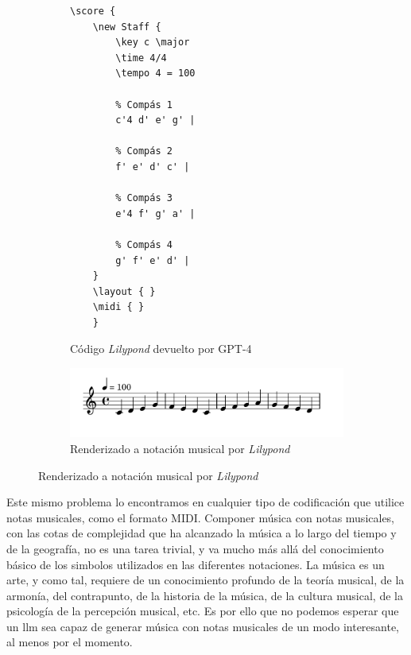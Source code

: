 \begin{figure}[h]
    \caption[Melodía de 4 compases generada por GPT-4, al estilo de Bach]{Melodía de 4 compases generada por GPT-4, al estilo de Bach. El \gls{llm} la entregó en formato Lilypond.}
    \centering
    \begin{subfigure}{.48\textwidth}
        \centering
        \begin{mdframed}
        \begin{verbatim}
\score {
    \new Staff {
        \key c \major
        \time 4/4
        \tempo 4 = 100
    
        % Compás 1
        c'4 d' e' g' |
    
        % Compás 2
        f' e' d' c' |
    
        % Compás 3
        e'4 f' g' a' |
    
        % Compás 4
        g' f' e' d' |
    }
    \layout { }
    \midi { }
    }
        \end{verbatim}
        \end{mdframed}
        \caption{Código \textit{Lilypond} devuelto por GPT-4}
      \end{subfigure} \hfill

      \vspace{5mm} %

      \begin{subfigure}{.75\textwidth}
        \centering
        \includegraphics[width=1\textwidth]{./figuras/melodia_bach_estilo.png}
        \caption{Renderizado a notación musical por \textit{Lilypond}}
      \end{subfigure}\hfill
    \source{\propio}
    \label{fig:melodia_bach}
\end{figure}

Este mismo problema lo encontramos en cualquier tipo de codificación que utilice notas musicales, como el formato MIDI.
Componer música con notas musicales, con las cotas de complejidad que ha alcanzado la música a lo largo del tiempo y de la geografía, no es una tarea trivial, y va mucho más allá del conocimiento básico de los simbolos utilizados en las diferentes notaciones. La música es un arte, y como tal, requiere de un conocimiento profundo de la teoría musical, de la armonía, del contrapunto, de la historia de la música, de la cultura musical, de la psicología de la percepción musical, etc. Es por ello que no podemos esperar que un \gls{llm} sea capaz de generar música con notas musicales de un modo interesante, al menos por el momento.

